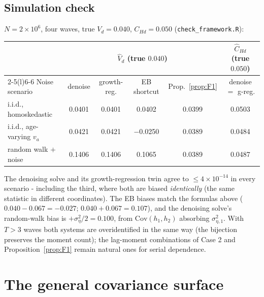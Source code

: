 \documentclass[11pt]{article}
\theoremstyle{remark}
\newcommand{\Cov}{\mathrm{Cov}}
\begin{document}
\subsection*{Simulation check}
$N=2\times10^6$, four waves, true $V_d=0.040$, $C_{Hd}=0.050$ (\texttt{check\_framework.R}):
\begin{center}
\small
\begin{tabular}{@{}lccccc@{}}
\toprule
& \multicolumn{4}{c}{$\hat V_d$ (true $0.040$)} & $\hat C_{Hd}$ (true $0.050$)\\
\cmidrule(lr){2-5}\cmidrule(l){6-6}
Noise scenario & denoise & growth-reg. & EB shortcut & Prop.~\ref{prop:F1} & denoise $=$ g-reg.\\
\midrule
i.i.d., homoskedastic            & 0.0401 & 0.0401 & 0.0402    & 0.0399 & 0.0503\\
i.i.d., age-varying $v_a$ & 0.0421 & 0.0421 & $-$0.0250 & 0.0389 & 0.0484\\
random walk $+$ noise            & 0.1406 & 0.1406 & 0.1065    & 0.0389 & 0.0487\\
\bottomrule
\end{tabular}
\end{center}
The denoising solve and its growth-regression twin agree to $\le4\times10^{-14}$ in every scenario - including the third, where both are biased \emph{identically} (the same statistic in different coordinates).
The EB biases match the formulas above ($0.040-0.067=-0.027$; $0.040+0.067=0.107$), and the denoising solve's random-walk bias is $+\sigma^2_\eta/2=0.100$, from $\Cov(h_1,h_2)$ absorbing $\sigma^2_{\eta,1}$.
With $T>3$ waves both systems are overidentified in the same way (the bijection preserves the moment count); the lag-moment combinations of Case 2 and Proposition~\ref{prop:F1} remain natural ones for serial dependence.

\section{The general covariance surface}\label{app:surface}
\end{document}
